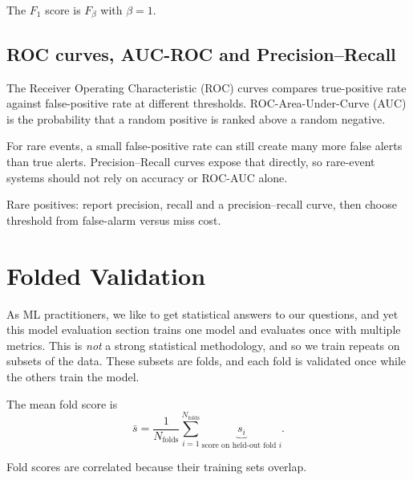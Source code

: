\begin{calloutspecialcase}
    The $F_1$ score is $F_\beta$ with $\beta=1$.
\end{calloutspecialcase}


\subsection{ROC curves, AUC-ROC and Precision--Recall}
\label{sec:evaluation-roc-curves-auc-roc-and-precision-recall}
The Receiver Operating Characteristic (ROC) curves compares true-positive rate against false-positive rate at different thresholds.
ROC-Area-Under-Curve (AUC) is the probability that a random positive is ranked above a random negative.


For rare events, a small false-positive rate can still create many more false alerts than true alerts.
Precision--Recall curves expose that directly, so rare-event systems should not rely on accuracy or ROC-AUC alone.

\begin{calloutpractical}
    Rare positives: report precision, recall and a precision--recall curve, then choose threshold from false-alarm versus miss cost.
\end{calloutpractical}


\section{Folded Validation}
\label{sec:evaluation-cross-validation-and-fold-choice}
As ML practitioners, we like to get statistical answers to our questions, and yet this model evaluation section trains one model and evaluates once with multiple metrics.
This is \textit{not} a strong statistical methodology, and so we train repeats on subsets of the data. 
These subsets are folds, and each fold is validated once while the others train the model.

The mean fold score is
\[
    \bar s
    =
    \frac{1}{N_{\text{folds}}}
    \sum_{i=1}^{N_{\text{folds}}}
    \underbrace{s_i}_{\text{score on held-out fold }i}.
\]
\begin{calloutpractical}
    Fold scores are correlated because their training sets overlap.
\end{calloutpractical}


